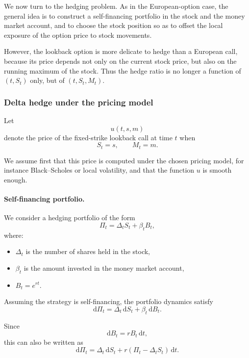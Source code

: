 \documentclass[11pt]{article}
\theoremstyle{plain}
\theoremstyle{definition}
\theoremstyle{remark}
\begin{document}
We now turn to the hedging problem.
As in the European-option case, the general idea is to construct a
self-financing portfolio in the stock and the money market account, and
to choose the stock position so as to offset the local exposure of the
option price to stock movements.

However, the lookback option is more delicate to hedge than a European
call, because its price depends not only on the current stock price, but
also on the running maximum of the stock.
Thus the hedge ratio is no longer a function of \((t,S_t)\) only, but of
\((t,S_t,M_t)\).

\subsubsection{Delta hedge under the pricing model}

Let
\[
u(t,s,m)
\]
denote the price of the fixed-strike lookback call at time \(t\) when
\[
S_t=s,
\qquad
M_t=m.
\]

We assume first that this price is computed under the chosen pricing
model, for instance Black--Scholes or local volatility, and that the
function \(u\) is smooth enough.

\paragraph{Self-financing portfolio.}
We consider a hedging portfolio of the form
\[
\Pi_t=\Delta_t S_t+\beta_t B_t,
\]
where:
\begin{itemize}[leftmargin=1.4em]
    \item \(\Delta_t\) is the number of shares held in the stock,
    \item \(\beta_t\) is the amount invested in the money market account,
    \item \(B_t=e^{rt}\).
\end{itemize}

Assuming the strategy is self-financing, the portfolio dynamics satisfy
\[
\mathrm{d}\Pi_t=\Delta_t\,\mathrm{d}S_t+\beta_t\,\mathrm{d}B_t.
\]

Since
\[
\mathrm{d}B_t=rB_t\,\mathrm{d}t,
\]
this can also be written as
\[
\mathrm{d}\Pi_t
=
\Delta_t\,\mathrm{d}S_t+r(\Pi_t-\Delta_t S_t)\,\mathrm{d}t.
\]
\end{document}
